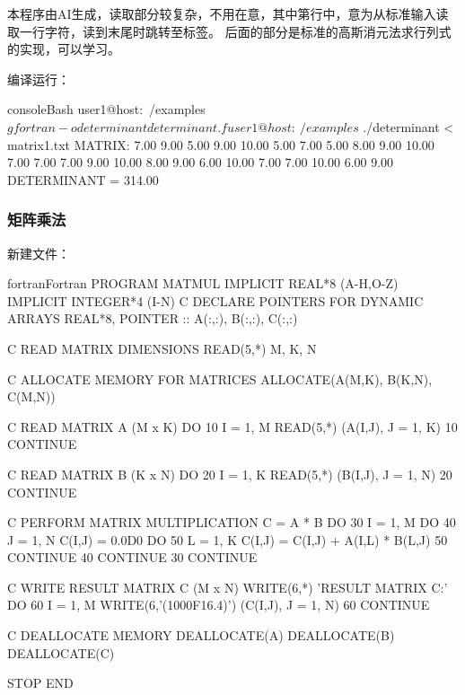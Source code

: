 本程序由AI生成，读取部分较复杂，不用在意，其中第行中，意为从标准输入读取一行字符，读到末尾时跳转至标签。
后面的部分是标准的高斯消元法求行列式的实现，可以学习。

编译运行：
\begin{envcode}{console}{Bash}
user1@host:~/examples$ gfortran -o determinant determinant.f
user1@host:~/examples$ ./determinant < matrix1.txt
 MATRIX:
      7.00      9.00      5.00      9.00     10.00
      5.00      7.00      5.00      8.00      9.00
     10.00      7.00      7.00      7.00      9.00
     10.00      8.00      9.00      6.00     10.00
      7.00      7.00     10.00      6.00      9.00
DETERMINANT =     314.00
\end{envcode}

\subsubsection{矩阵乘法}

新建文件：
\begin{envcode}{fortran}{Fortran}
      PROGRAM MATMUL
      IMPLICIT REAL*8 (A-H,O-Z)
      IMPLICIT INTEGER*4 (I-N)
C     DECLARE POINTERS FOR DYNAMIC ARRAYS
      REAL*8, POINTER :: A(:,:), B(:,:), C(:,:)
      
C     READ MATRIX DIMENSIONS
      READ(5,*) M, K, N
      
C     ALLOCATE MEMORY FOR MATRICES
      ALLOCATE(A(M,K), B(K,N), C(M,N))
      
C     READ MATRIX A (M x K)
      DO 10 I = 1, M
        READ(5,*) (A(I,J), J = 1, K)
10    CONTINUE
      
C     READ MATRIX B (K x N)
      DO 20 I = 1, K
        READ(5,*) (B(I,J), J = 1, N)
20    CONTINUE
      
C     PERFORM MATRIX MULTIPLICATION C = A * B
      DO 30 I = 1, M
        DO 40 J = 1, N
          C(I,J) = 0.0D0
          DO 50 L = 1, K
            C(I,J) = C(I,J) + A(I,L) * B(L,J)
50        CONTINUE
40      CONTINUE
30    CONTINUE
      
C     WRITE RESULT MATRIX C (M x N)
      WRITE(6,*) 'RESULT MATRIX C:'
      DO 60 I = 1, M
        WRITE(6,'(1000F16.4)') (C(I,J), J = 1, N)
60    CONTINUE
      
C     DEALLOCATE MEMORY
      DEALLOCATE(A)
      DEALLOCATE(B)
      DEALLOCATE(C)
      
      STOP
      END
\end{envcode}

